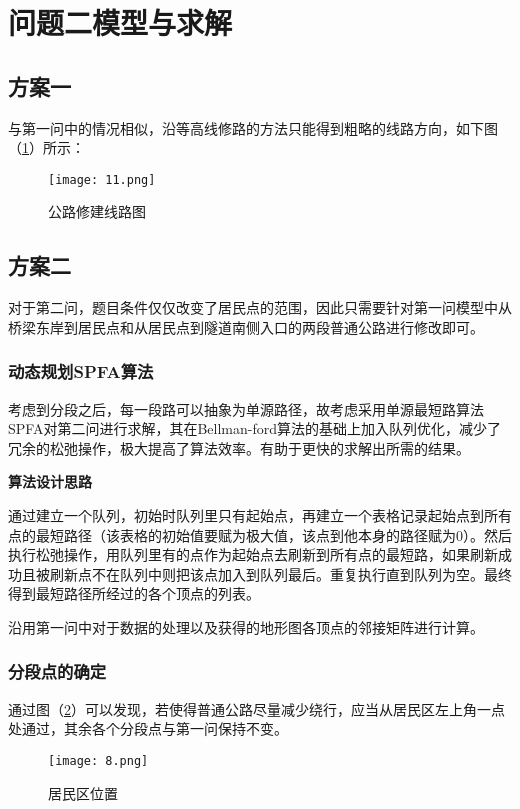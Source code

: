 \documentclass[bwprint]{cumcmthesis}
\begin{document}
\section{问题二模型与求解}
\subsection{方案一}
与第一问中的情况相似，沿等高线修路的方法只能得到粗略的线路方向，如下图（\ref{公路修建线路图2}）所示：
\begin{figure}[h]
\small
\centering
\texttt{[image: 11.png]}
\caption{公路修建线路图} 
\label{公路修建线路图2}
\end{figure}


\subsection{方案二}
对于第二问，题目条件仅仅改变了居民点的范围，因此只需要针对第一问模型中从桥梁东岸到居民点和从居民点到隧道南侧入口的两段普通公路进行修改即可。
\subsubsection{动态规划SPFA算法}
考虑到分段之后，每一段路可以抽象为单源路径，故考虑采用单源最短路算法SPFA对第二问进行求解，其在Bellman-ford算法的基础上加入队列优化，减少了冗余的松弛操作，极大提高了算法效率。有助于更快的求解出所需的结果。

\textbf{算法设计思路}

通过建立一个队列，初始时队列里只有起始点，再建立一个表格记录起始点到所有点的最短路径（该表格的初始值要赋为极大值，该点到他本身的路径赋为0）。然后执行松弛操作，用队列里有的点作为起始点去刷新到所有点的最短路，如果刷新成功且被刷新点不在队列中则把该点加入到队列最后。重复执行直到队列为空。最终得到最短路径所经过的各个顶点的列表。

沿用第一问中对于数据的处理以及获得的地形图各顶点的邻接矩阵进行计算。

\subsubsection{分段点的确定}

通过图（\ref{居民区位置}）可以发现，若使得普通公路尽量减少绕行，应当从居民区左上角一点处通过，其余各个分段点与第一问保持不变。

\begin{figure}[h]
\small
\centering
\texttt{[image: 8.png]}
\caption{居民区位置} 
\label{居民区位置}
\end{figure}
\end{document}

